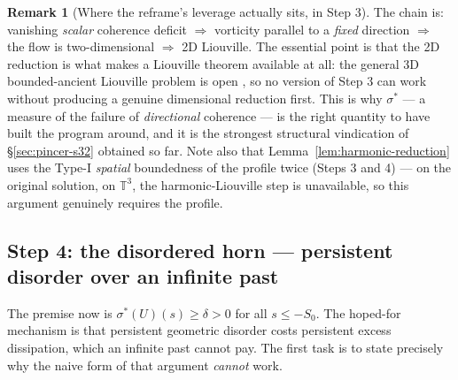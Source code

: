 \documentclass[11pt]{article}
\theoremstyle{definition}
\newtheorem{remark}[theorem]{Remark}
\theoremstyle{remark}
\newcommand{\T}{\mathbb{T}}
\begin{document}
\begin{remark}[Where the reframe's leverage actually sits, in Step 3]
  The chain is: vanishing \emph{scalar} coherence deficit $\Rightarrow$
  vorticity parallel to a \emph{fixed} direction $\Rightarrow$ the flow is
  two-dimensional $\Rightarrow$ 2D Liouville. The essential point is that the
  2D reduction is what makes a Liouville theorem available at all: the
  general 3D bounded-ancient Liouville problem is open \cite{KNSS2009}, so no
  version of Step 3 can work without producing a genuine dimensional
  reduction first. This is why $\sigma^*$ --- a measure of the failure of
  \emph{directional} coherence --- is the right quantity to have built the
  program around, and it is the strongest structural vindication of
  \S\ref{sec:pincer-s32} obtained so far. Note also that
  Lemma~\ref{lem:harmonic-reduction} uses the Type-I \emph{spatial}
  boundedness of the profile twice (Steps 3 and 4) --- on the original
  solution, on $\T^3$, the harmonic-Liouville step is unavailable, so this
  argument genuinely requires the profile.
\end{remark}

\subsection{Step 4: the disordered horn --- persistent disorder over an infinite past}
\label{subsec:s39-step4}

The premise now is $\sigma^*(U)(s)\geq\delta>0$ for all $s\leq -S_0$. The hoped-for
mechanism is that persistent geometric disorder costs persistent excess
dissipation, which an infinite past cannot pay. The first task is to state
precisely why the naive form of that argument \emph{cannot} work.
\end{document}
